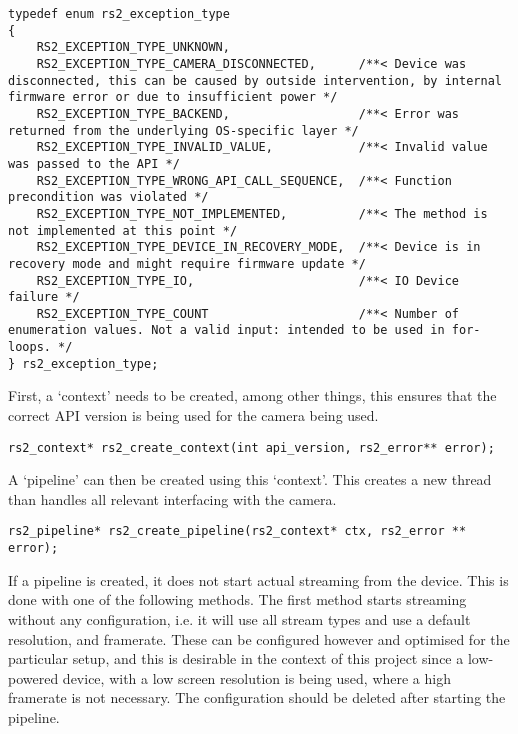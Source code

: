     \begin{lstlisting}[style=CStyle]
typedef enum rs2_exception_type
{
    RS2_EXCEPTION_TYPE_UNKNOWN,
    RS2_EXCEPTION_TYPE_CAMERA_DISCONNECTED,      /**< Device was disconnected, this can be caused by outside intervention, by internal firmware error or due to insufficient power */
    RS2_EXCEPTION_TYPE_BACKEND,                  /**< Error was returned from the underlying OS-specific layer */
    RS2_EXCEPTION_TYPE_INVALID_VALUE,            /**< Invalid value was passed to the API */
    RS2_EXCEPTION_TYPE_WRONG_API_CALL_SEQUENCE,  /**< Function precondition was violated */
    RS2_EXCEPTION_TYPE_NOT_IMPLEMENTED,          /**< The method is not implemented at this point */
    RS2_EXCEPTION_TYPE_DEVICE_IN_RECOVERY_MODE,  /**< Device is in recovery mode and might require firmware update */
    RS2_EXCEPTION_TYPE_IO,                       /**< IO Device failure */
    RS2_EXCEPTION_TYPE_COUNT                     /**< Number of enumeration values. Not a valid input: intended to be used in for-loops. */
} rs2_exception_type;\end{lstlisting}

    First, a `context' needs to be created, among other things, this ensures that the correct API version is being used for the camera being used.
    \begin{lstlisting}[style=CStyle]
rs2_context* rs2_create_context(int api_version, rs2_error** error);\end{lstlisting}

    A `pipeline' can then be created using this `context'. This creates a new thread than handles all relevant interfacing with the camera.

    \begin{lstlisting}[style=CStyle]
rs2_pipeline* rs2_create_pipeline(rs2_context* ctx, rs2_error ** error);\end{lstlisting}   

    If a pipeline is created, it does not start actual streaming from the device. This is done with one of the following methods. The first method starts streaming without any configuration, i.e. it will use all stream types and use a default resolution, and framerate. These can be configured however and optimised for the particular setup, and this is desirable in the context of this project since a low-powered device, with a low screen resolution is being used, where a high framerate is not necessary. The configuration should be deleted after starting the pipeline.

